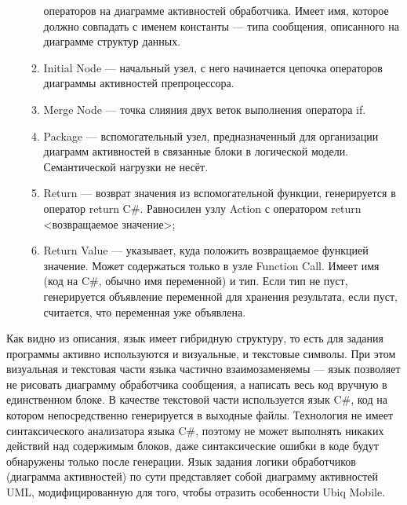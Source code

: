 \begin{enumerate}
\begin{enumerate}
				операторов на диаграмме активностей обработчика. Имеет имя, которое должно 
				совпадать с именем константы --- типа сообщения, описанного на диаграмме структур 
				данных.
			\item Initial Node --- начальный узел, с него начинается цепочка операторов 
				диаграммы активностей препроцессора.
			\item Merge Node --- точка слияния двух веток выполнения оператора if.
			\item Package --- вспомогательный узел, предназначенный для организации диаграмм 
				активностей в связанные блоки в логической модели. Семантической нагрузки не несёт.
			\item Return --- возврат значения из вспомогательной функции, генерируется в 
				оператор return C\#. Равносилен узлу Action с оператором return <возвращаемое значение>;
			\item Return Value --- указывает, куда положить возвращаемое функцией значение. 
				Может содержаться только в узле Function Call. Имеет имя (код на C\#, обычно 
				имя переменной) и тип. Если тип не пуст, генерируется объявление переменной 
				для хранения результата, если пуст, считается, что переменная уже объявлена.
		\end{enumerate}
\end{enumerate}


Как видно из описания, язык имеет гибридную структуру, то есть для задания программы 
активно используются и визуальные, и текстовые символы. При этом визуальная и текстовая 
части языка частично взаимозаменяемы --- язык позволяет не рисовать диаграмму обработчика 
сообщения, а написать весь код вручную в единственном блоке. В качестве текстовой 
части используется язык C\#, код на котором непосредственно генерируется в выходные 
файлы. Технология не имеет синтаксического анализатора языка C\#, поэтому не может 
выполнять никаких действий над содержимым блоков, даже синтаксические ошибки в коде 
будут обнаружены только после генерации. Язык задания логики обработчиков (диаграмма 
активностей) по сути представляет собой диаграмму активностей UML, модифицированную 
для того, чтобы отразить особенности Ubiq Mobile.

